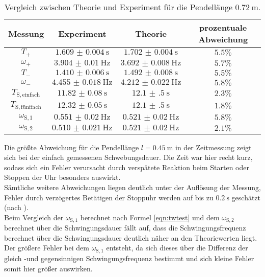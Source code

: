 \begin{table}
	\centering
	\caption{Vergleich zwischen Theorie und Experiment für die Pendellänge $\SI{0.72}{\meter}$.}
	\label{tab:discuss2}
	\begin{tabular}{cccc}
		\toprule
		Messung                    & Experiment               & Theorie                  & prozentuale Abweichung \\
		\midrule
		$T_{\mathrm{+}}$           & $\SI{1.609(4)}{\second}$ & $\SI{1.702(4)}{\second}$ & $5.5\%$                \\
		$\omega_{\mathrm{+}}$      & $\SI{3.904(10)}{\Hz}$    & $\SI{3.692(8)}{\Hz}$     & $5.7\%$                \\
		$T_{\mathrm{-}}$           & $\SI{1.410(6)}{\second}$ & $\SI{1.492(8)}{\second}$ & $5.5\% $               \\
		$\omega_{\mathrm{-}}$      & $\SI{4.455(18)}{\hertz}$ & $\SI{4.212(22)}{\Hz}$    & $5.8\%$                \\
		$T_{\mathrm{S,einfach}}$   & $\SI{11.82(8)}{\second}$ & $\SI{12.1(5)}{\second}$  & $2.3\%$                \\
		$T_{\mathrm{S,fünffach}}$ & $\SI{12.32(5)}{\second}$ & $\SI{12.1(5)}{\second}$  & $1.8\%$                \\
		$\omega_{\mathrm{S,1}}$    & $\SI{0.551(20)}{\Hz}$    & $\SI{0.521(20)}{\Hz}$    & $5.8\%$                \\
		$\omega_{\mathrm{S,2}}$    & $\SI{0.510(21)}{\Hz}$    & $\SI{0.521(20)}{\Hz}$    & $2.1\%$                \\

		\bottomrule
	\end{tabular}
\end{table}

Die größte Abweichung für die Pendellänge $l=\SI{0.45}{\meter}$ in der Zeitmessung zeigt sich bei der einfach gemessenen Schwebungsdauer.
Die Zeit war hier recht kurz, sodass sich ein Fehler verursacht durch verspätete Reaktion beim Starten oder Stoppen der Uhr besonders auswirkt.\\

Sämtliche weitere Abweichungen liegen deutlich unter der Auflösung der Messung, Fehler durch verzögertes Betätigen der Stoppuhr werden auf bis zu $\SI{0.2}{\second}$ geschätzt (nach \cite{CS-Pro}).\\
Beim Vergleich der $\omega_{\mathrm{S,1}}$ berechnet nach Formel \eqref{eqn:twtest} und dem $\omega_{\mathrm{S,2}}$ berechnet über die Schwingungsdauer fällt auf, dass die Schwingungsfrequenz berechnet über die Schwingungsdauer deutlich näher an den Theoriewerten liegt.\\
Der größere Fehler bei dem  $\omega_{\mathrm{S,1}}$ entsteht, da sich dieses über die Differenz der gleich -und gegensinnigen Schwingungsfrequenz bestimmt und sich kleine Fehler somit hier größer auswirken.\\


